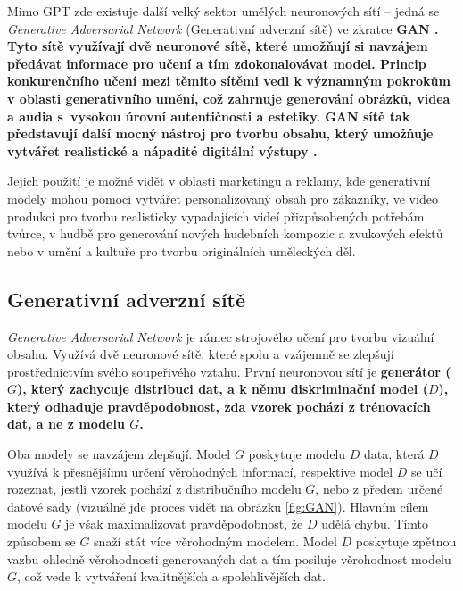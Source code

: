 \bigskip

\noindent Mimo GPT zde existuje další velký sektor umělých neuronových sítí -- jedná se \textit{Generative Adversarial Network} (Generativní adverzní sítě) ve zkratce \bf GAN \rm \cite{goodfellow2014generative}. Tyto sítě využívají dvě neuronové sítě, které umožňují si navzájem předávat informace pro učení a tím zdokonalovávat model. Princip konkurenčního učení mezi těmito sítěmi vedl k významným pokrokům v oblasti generativního umění, což zahrnuje generování obrázků, videa a audia s~vysokou úrovní autentičnosti a estetiky. GAN sítě tak představují další mocný nástroj pro tvorbu obsahu, který umožňuje vytvářet realistické a nápadité digitální výstupy \cite{goodfellow2014generative}\cite{MediumAI}.

Jejich použití je možné vidět v oblasti marketingu a reklamy, kde generativní modely mohou pomoci vytvářet personalizovaný obsah pro zákazníky, ve video produkci pro tvorbu realisticky vypadajících videí přizpůsobených potřebám tvůrce, v hudbě pro generování nových hudebních kompozic a zvukových efektů nebo v umění a kultuře pro tvorbu originálních uměleckých děl.


\subsection*{Generativní adverzní sítě}
\label{section-gan}

\textit{Generative Adversarial Network} \cite{goodfellow2014generative} je rámec strojového učení pro tvorbu vizuální obsahu. Využívá dvě neuronové sítě, které spolu  a vzájemně se zlepšují prostřednictvím svého soupeřivého vztahu. První neuronovou sítí je \bf generátor \rm($G$), který zachycuje distribuci dat, a k němu \bf diskriminační model \rm($D$), který odhaduje pravděpodobnost, zda vzorek pochází z trénovacích dat, a ne z modelu $G$.

\bigskip

\noindent Oba modely se navzájem zlepšují. Model $G$ poskytuje modelu $D$ data, která $D$ využívá k přesnějšímu určení věrohodných informací, respektive model $D$ se učí rozeznat, jestli vzorek pochází z distribučního modelu $G$, nebo z předem určené datové sady (vizuálně jde proces vidět na obrázku \ref{fig:GAN}). Hlavním cílem modelu $G$ je však maximalizovat pravděpodobnost, že $D$ udělá chybu. Tímto způsobem se $G$ snaží stát více věrohodným modelem. Model $D$ poskytuje zpětnou vazbu ohledně věrohodnosti generovaných dat a tím posiluje věrohodnost modelu $G$, což vede k vytváření kvalitnějších a spolehlivějších dat.

